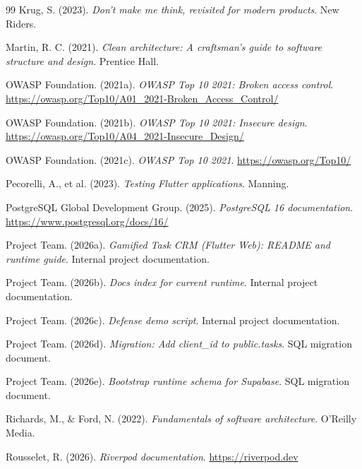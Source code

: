 \begin{thebibliography}{99}
Krug, S. (2023). \textit{Don't make me think, revisited for modern products}. New Riders.

Martin, R. C. (2021). \textit{Clean architecture: A craftsman's guide to software structure and design}. Prentice Hall.

OWASP Foundation. (2021a). \textit{OWASP Top 10 2021: Broken access control}. \url{https://owasp.org/Top10/A01_2021-Broken_Access_Control/}

OWASP Foundation. (2021b). \textit{OWASP Top 10 2021: Insecure design}. \url{https://owasp.org/Top10/A04_2021-Insecure_Design/}

OWASP Foundation. (2021c). \textit{OWASP Top 10 2021}. \url{https://owasp.org/Top10/}

Pecorelli, A., et al. (2023). \textit{Testing Flutter applications}. Manning.

PostgreSQL Global Development Group. (2025). \textit{PostgreSQL 16 documentation}. \url{https://www.postgresql.org/docs/16/}

Project Team. (2026a). \textit{Gamified Task CRM (Flutter Web): README and runtime guide}. Internal project documentation.

Project Team. (2026b). \textit{Docs index for current runtime}. Internal project documentation.

Project Team. (2026c). \textit{Defense demo script}. Internal project documentation.

Project Team. (2026d). \textit{Migration: Add client\_id to public.tasks}. SQL migration document.

Project Team. (2026e). \textit{Bootstrap runtime schema for Supabase}. SQL migration document.

Richards, M., \& Ford, N. (2022). \textit{Fundamentals of software architecture}. O'Reilly Media.

Rousselet, R. (2026). \textit{Riverpod documentation}. \url{https://riverpod.dev}


\end{thebibliography}

